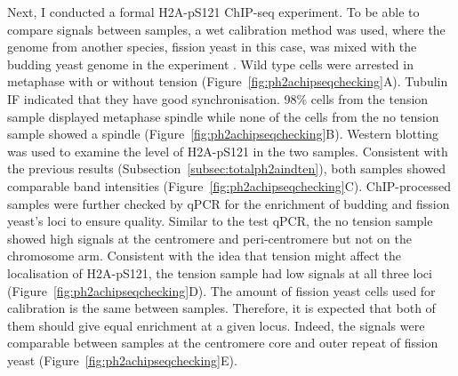 Next, I conducted a formal H2A-pS121 ChIP-seq experiment. To be able to compare signals between samples, a wet calibration method was used, where the genome from another species, fission yeast in this case, was mixed with the budding yeast genome in the experiment \citep{Hu2015BiologicalChIP-seq}. Wild type cells were arrested in metaphase with or without tension (Figure~\ref{fig:ph2achipseqchecking}A). Tubulin IF indicated that they have good synchronisation. 98\% cells from the tension sample displayed metaphase spindle while none of the cells from the no tension sample showed a spindle (Figure~\ref{fig:ph2achipseqchecking}B). Western blotting was used to examine the level of H2A-pS121 in the two samples. Consistent with the previous results (Subsection~\ref{subsec:totalph2aindten}), both samples showed comparable band intensities (Figure~\ref{fig:ph2achipseqchecking}C). ChIP-processed samples were further checked by qPCR for the enrichment of budding and fission yeast's loci to ensure quality. Similar to the test qPCR, the no tension sample showed high signals at the centromere and peri-centromere but not on the chromosome arm. Consistent with the idea that tension might affect the localisation of H2A-pS121, the tension sample had low signals at all three loci (Figure~\ref{fig:ph2achipseqchecking}D). The amount of fission yeast cells used for calibration is the same between samples. Therefore, it is expected that both of them should give equal enrichment at a given locus. Indeed, the signals were comparable between samples at the centromere core and outer repeat of fission yeast (Figure~\ref{fig:ph2achipseqchecking}E). 

